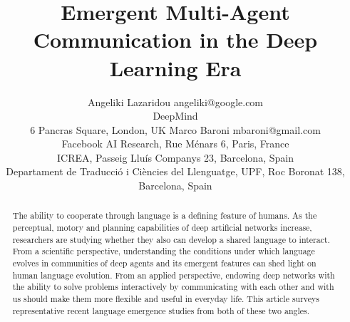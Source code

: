 \documentclass[twoside,11pt]{article}
\begin{document}
\title{Emergent Multi-Agent Communication in the Deep Learning Era}

\author{\name Angeliki Lazaridou \email angeliki@google.com \\
       \addr DeepMind \\6 Pancras Square, London, UK       
       \AND
       \name Marco Baroni \email mbaroni@gmail.com \\
       \addr Facebook AI Research, Rue M\'enars 6, Paris, France \\
       \addr ICREA, Passeig Llu\'is Companys 23, Barcelona, Spain \\
       \addr Departament de Traducci\'o i Ci\`encies del Llenguatge, UPF, Roc Boronat 138, Barcelona, Spain
       }

\maketitle

\begin{abstract}
  The ability to cooperate through language is a defining feature of humans. As
the perceptual, motory and planning capabilities of deep artificial networks
increase, researchers are studying whether they also can develop a shared
language to interact. %
From a scientific perspective, understanding the conditions under which
language evolves in communities of deep agents and its emergent features can shed light on human language evolution. From an applied perspective, endowing deep networks
with the ability to solve problems interactively by communicating with each
other and with us should make them more flexible and useful in everyday life. %
 This article surveys representative recent language emergence studies from
 both of these two angles.

\end{abstract}














\end{document}
